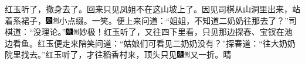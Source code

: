红玉听了，撤身去了。回来只见凤姐不在这山坡上了。因见司棋从山洞里出来，站着系裙子，{\includegraphics[width=3mm]{../Images/00004}\includegraphics[width=3mm]{../Images/00011}\footnotesize \kaishu 小点缀。一笑。}便上来问道：“姐姐，不知道二奶奶往那去了？”司棋道：“没理论。”{\includegraphics[width=3mm]{../Images/00004}\includegraphics[width=3mm]{../Images/00011}\footnotesize \kaishu 妙极！}红玉听了，又往四下里看，只见那边探春、宝钗在池边看鱼。红玉便走来陪笑问道：“姑娘们可看见二奶奶没有？”探春道：“往大奶奶院里找去。”红玉听了，才往稻香村来，顶头只见{\includegraphics[width=3mm]{../Images/00004}\includegraphics[width=3mm]{../Images/00011}\footnotesize \kaishu 又一折。}晴